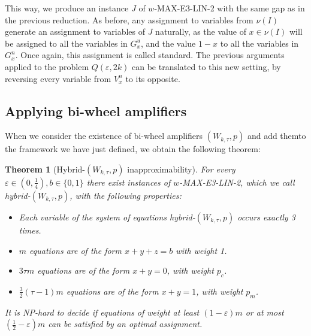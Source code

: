 \documentclass[12pt]{article}
\newtheorem{theorem}{Theorem}
\begin{document}
This way, we produce an instance $J$ of $w$-MAX-E3-LIN-2 with the same gap as in the previous reduction. As before, any assignment to variables from $\nu(I)$ generate an assignment to variables of $J$ naturally, as the value of $x\in \nu(I)$ will be assigned to all the variables in $G^u_x$, and the value $1-x$ to all the variables in $G^n_x$. Once again, this assignment is called standard.
The previous arguments applied to the problem $Q(\varepsilon, 2k)$ can be translated to this new setting, by reversing every variable from $V_x^n$ to its opposite. 
\subsection{Applying bi-wheel amplifiers}
When we consider the existence of bi-wheel amplifiers $(W_{k,\tau},p)$ and add themto the framework we have just defined, we obtain the following theorem:
\begin{theorem}[Hybrid-$(W_{k,\tau},p)$ inapproximability]\label{origin}
    For every $\varepsilon \in (0, \frac{1}{4}),  b\in \{0,1\}$ there exist instances of $w$-MAX-E3-LIN-2, which we call hybrid-$(W_{k,\tau},p)$, with the following properties:
    \begin{itemize}
        \item Each variable of the system of equations hybrid-$(W_{k,\tau},p)$ occurs exactly 3 times.
        \item $m$ equations are of the form $x+y+z=b$ with weight 1.
        \item $3\tau m$ equations are of the form $x+y=0$, with weight $p_c$.
        \item $\frac{3}{2}(\tau-1) m$ equations are of the form $x+y=1$, with weight $p_m$.
    \end{itemize}
    It is NP-hard to decide if equations of weight at least  $(1-\varepsilon) m$ or at most $(\frac{1}{2} - \varepsilon)m$  can be satisfied by an optimal assignment. 
\end{theorem}
\end{document}
